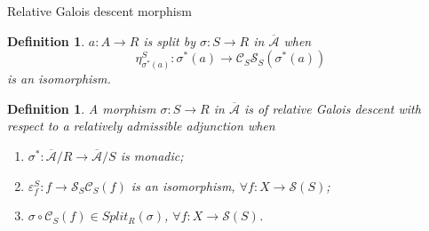 \documentclass[4pt]{beamer}
\newtheorem{defi}[teo]{Definition}
\begin{document}
\begin{frame}{Relative Galois descent morphism}
    \begin{defi}    
        $a:A\to R$ is split by $\sigma:S\to R$ in $\overline{\mathcal{A}}$ when
        \[ \eta^S_{\sigma^*(a)}:\sigma^*(a)\longrightarrow \mathcal{C}_S\mathcal{S}_S(\sigma^*(a)) \]
        is an isomorphism.
    \end{defi}

    \pause \vspace{2mm}
    
    \begin{defi}
        A morphism $\sigma:S\longrightarrow R$ in $\overline{\mathcal{A}}$ is of relative Galois descent with respect to a relatively admissible adjunction when
        \begin{enumerate}
            \item $\sigma^*:\overline{\mathcal{A}}/R\longrightarrow\overline{\mathcal{A}}/S$ is monadic;
            \vspace{1mm}
            \item $\varepsilon^S_f:f\to\mathcal{S}_S\mathcal{C}_S(f)$ is an isomorphism, $\forall f:X\to\mathcal{S}(S)$;
            \vspace{1mm}
            \item $\sigma\circ \mathcal{C}_S(f)\in Split_R(\sigma)$, $\forall f:X\to\mathcal{S}(S)$.
        \end{enumerate}
    \end{defi}
\end{frame}
\end{document}
